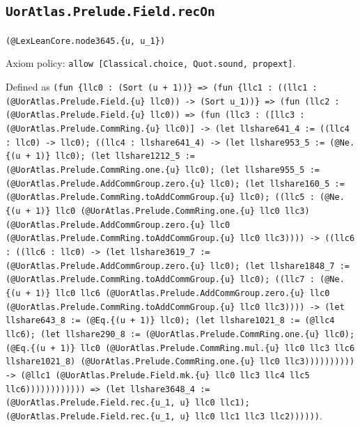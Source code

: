 \documentclass[11pt]{article}
\begin{document}
\subsection*{\texttt{UorAtlas.Prelude.Field.recOn}}
\noindent\texttt{(@LexLeanCore.node3645.\{u, u\_1\})}\par
\noindent Axiom policy: \texttt{allow [Classical.choice, Quot.sound, propext]}.\par
\noindent Defined as \texttt{(fun \{llc0 : (Sort (u + 1))\} => (fun \{llc1 : ((llc1 : (@UorAtlas.Prelude.Field.\{u\} llc0)) -> (Sort u\_1))\} => (fun (llc2 : (@UorAtlas.Prelude.Field.\{u\} llc0)) => (fun (llc3 : ([llc3 : (@UorAtlas.Prelude.CommRing.\{u\} llc0)] -> (let llshare641\_4 := ((llc4 : llc0) -> llc0); ((llc4 : llshare641\_4) -> (let llshare953\_5 := (@Ne.\{(u + 1)\} llc0); (let llshare1212\_5 := (@UorAtlas.Prelude.CommRing.one.\{u\} llc0); (let llshare955\_5 := (@UorAtlas.Prelude.AddCommGroup.zero.\{u\} llc0); (let llshare160\_5 := (@UorAtlas.Prelude.CommRing.toAddCommGroup.\{u\} llc0); ((llc5 : (@Ne.\{(u + 1)\} llc0 (@UorAtlas.Prelude.CommRing.one.\{u\} llc0 llc3) (@UorAtlas.Prelude.AddCommGroup.zero.\{u\} llc0 (@UorAtlas.Prelude.CommRing.toAddCommGroup.\{u\} llc0 llc3)))) -> ((llc6 : ((llc6 : llc0) -> (let llshare3619\_7 := (@UorAtlas.Prelude.AddCommGroup.zero.\{u\} llc0); (let llshare1848\_7 := (@UorAtlas.Prelude.CommRing.toAddCommGroup.\{u\} llc0); ((llc7 : (@Ne.\{(u + 1)\} llc0 llc6 (@UorAtlas.Prelude.AddCommGroup.zero.\{u\} llc0 (@UorAtlas.Prelude.CommRing.toAddCommGroup.\{u\} llc0 llc3)))) -> (let llshare643\_8 := (@Eq.\{(u + 1)\} llc0); (let llshare1021\_8 := (@llc4 llc6); (let llshare290\_8 := (@UorAtlas.Prelude.CommRing.one.\{u\} llc0); (@Eq.\{(u + 1)\} llc0 (@UorAtlas.Prelude.CommRing.mul.\{u\} llc0 llc3 llc6 llshare1021\_8) (@UorAtlas.Prelude.CommRing.one.\{u\} llc0 llc3)))))))))) -> (@llc1 (@UorAtlas.Prelude.Field.mk.\{u\} llc0 llc3 llc4 llc5 llc6)))))))))))) => (let llshare3648\_4 := (@UorAtlas.Prelude.Field.rec.\{u\_1, u\} llc0 llc1); (@UorAtlas.Prelude.Field.rec.\{u\_1, u\} llc0 llc1 llc3 llc2))))))}.\par
\end{document}
